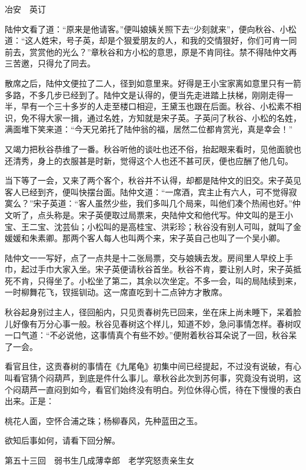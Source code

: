 \documentclass[12pt,UTF8]{ctexbook}
\begin{document}
{{{冶安　英订

陆仲文看了道：“原来是他请客。”便叫娘姨关照下去“少刻就来”，便向秋谷、小松道：“这人姓宋，号子英，却是个狠爱朋友的人，和我的交情狠好，你们可肯一同前去，赏赏他的光么？”章秋谷和方小松的意思，原是不肯同往。禁不得陆仲文再三苦邀，只得允了同去。

散席之后，陆仲文便拉了二人，径到如意里来。好得是王小宝家离如意里只有一箭多路，不多几步已经到了。陆仲文是认得的，便当先走进踏上扶梯，刚刚走得一半，早有一个三十多岁的人走至楼口相迎，王黛玉也跟在后面。秋谷、小松素不相识，免不得大家一揖，通过名姓，方知就是宋子英。子英问了秋谷、小松的名姓，满面堆下笑来道：“今天兄弟托了陆仲翁的福，居然二位都肯赏光，真是幸会！”

又竭力把秋谷恭维了一番。秋谷听他的谈吐也还不俗，抬起眼来看时，见他面貌也还清秀，身上的衣服甚是时新，觉得这个人也还不甚可厌，便也应酬了他几句。

当下等了一会，又来了两个客个，秋谷并不认得，却都是陆仲文的旧交。宋子英见客人已经到齐，便叫快摆台面。陆仲文道：“一席酒，宾主止有六人，可不觉得寂寞么？”宋子英道：“客人虽然少些，我们多叫几个局来，叫他们凑个热闹也好。”仲文听了，点头称是。宋子英便取过局票来，央陆仲文和他代写。仲文叫的是王小宝、王二宝、沈芸仙；小松叫的是高桂宝、洪彩珍；秋谷没有别人可叫，就叫了金媛媛和朱素卿。那两个客人每人也叫两个来，宋子英自己也叫了一个吴小卿。

陆仲文一一写好，点了一点共是十二张局票，交与娘姨去发。房间里人早绞上手巾，起过手巾大家入坐。宋子英便请秋谷首坐。秋谷不肯，要让别人时，宋子英抵死不肯，只得坐了。小松坐了第二，其余以次坐定。不多一会，叫的局陆续到来，一时柳舞花飞，钗摇钏动。这一席直吃到十二点钟方才散席。

秋谷起身别过主人，径回船内，只见贡春树先已回来，坐在床上尚未睡下，呆着脸儿好像有万分心事一般。秋谷见春树这个样儿，知道不妙，急问事情怎样。春树叹一口气道：“不必说他，这事情真个有些不妙。”便附着秋谷耳朵说了一回，秋谷呆了一会。

看官且住，这贡春树的事情在《九尾龟》初集中间已经提起，不过没有说破，有心叫看官猜个闷葫芦，到底是件什么事儿。章秋谷此次到苏何事，究竟没有说明，这个闷葫芦一直闷到如今，看官们始终没有明白。列位休得心慌，待在下慢慢的表白出来。正是：

桃花人面，空怀合浦之珠；杨柳春风，先种蓝田之玉。

欲知后事如何，请看下回分解。





第五十三回　弱书生几成薄幸郎　老学究怒责亲生女





}}}
\end{document}
